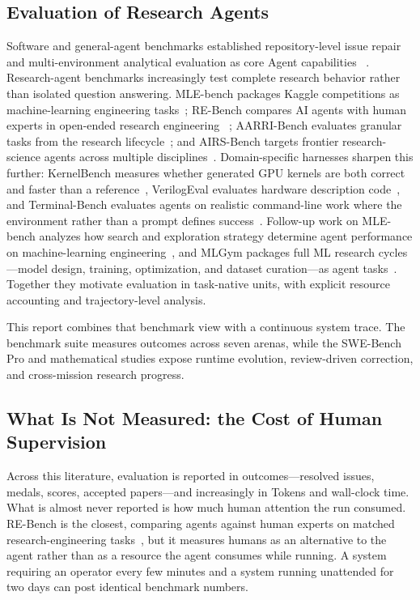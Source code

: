 \subsection{Evaluation of Research Agents}

Software and general-agent benchmarks established repository-level issue repair
and multi-environment analytical evaluation as core Agent capabilities
~\citep{jimenez2024swebench,liu2023agentbench,ma2024agentboard}.
Research-agent benchmarks increasingly test complete research behavior rather than
isolated question answering. MLE-bench packages Kaggle competitions as
machine-learning engineering tasks~\citep{chan2024mlebench}; RE-Bench compares AI
agents with human experts in open-ended research engineering
~\citep{wijk2024rebench}; AARRI-Bench evaluates granular tasks from the research
lifecycle~\citep{wang2026aarri}; and AIRS-Bench targets frontier research-science
agents across multiple disciplines~\citep{lupidi2026airsbench}. Domain-specific
harnesses sharpen this further: KernelBench measures whether generated GPU kernels
are both correct and faster than a reference~\citep{ouyang2025kernelbench},
VerilogEval evaluates hardware description code~\citep{liu2023verilogeval}, and
Terminal-Bench evaluates agents on realistic command-line work where the environment
rather than a prompt defines success~\citep{merrill2026terminalbench}. Follow-up work
on MLE-bench analyzes how search and exploration strategy determine agent
performance on machine-learning engineering~\citep{toledo2025mlebenchagents}, and
MLGym packages full ML research cycles---model design, training, optimization, and
dataset curation---as agent tasks~\citep{nathani2025mlgym}. Together they
motivate evaluation in task-native units, with explicit resource accounting and
trajectory-level analysis.

This report combines that benchmark view with a continuous system trace. The
benchmark suite measures outcomes across seven arenas, while the SWE-Bench Pro and
mathematical studies expose runtime evolution, review-driven correction, and
cross-mission research progress.

\subsection{What Is Not Measured: the Cost of Human Supervision}

Across this literature, evaluation is reported in outcomes---resolved issues, medals,
scores, accepted papers---and increasingly in Tokens and wall-clock time. What is
almost never reported is how much human attention the run consumed. RE-Bench is the
closest, comparing agents against human experts on matched research-engineering
tasks~\citep{wijk2024rebench}, but it measures humans as an alternative to the agent
rather than as a resource the agent consumes while running. A system requiring an
operator every few minutes and a system running unattended for two days can post
identical benchmark numbers.

